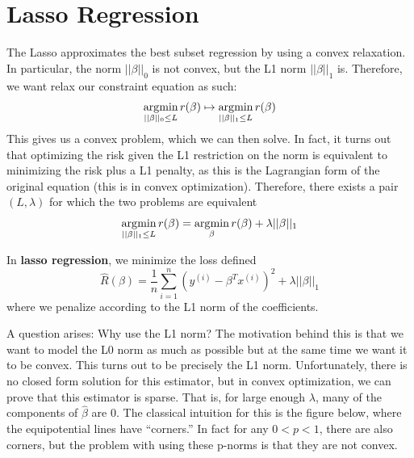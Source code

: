 \section{Lasso Regression} 

  The Lasso approximates the best subset regression by using a convex relaxation. In particular, the norm $||\beta||_0$ is not convex, but the L1 norm $||\beta||_1$ is. Therefore, we want relax our constraint equation as such: 
  \begin{equation}
    \operatorname*{\arg\!\min}_{||\beta||_0 \leq L} r(\beta) \mapsto \operatorname*{\arg\!\min}_{||\beta||_1 \leq L} r(\beta)
  \end{equation}
  This gives us a convex problem, which we can then solve. In fact, it turns out that optimizing the risk given the L1 restriction on the norm is equivalent to minimizing the risk plus a L1 penalty, as this is the Lagrangian form of the original equation (this is in convex optimization). Therefore, there exists a pair $(L, \lambda)$ for which the two problems are equivalent 
  \begin{equation}
    \operatorname*{\arg\!\min}_{||\beta||_1 \leq L} r(\beta) = \operatorname*{\arg\!\min}_{\beta} r(\beta) + \lambda ||\beta||_1
  \end{equation}

  \begin{definition}
    In \textbf{lasso regression}, we minimize the loss defined
    \begin{equation}
      \hat{R} (\beta) = \frac{1}{n} \sum_{i=1}^n (y^{(i)} - \beta^T x^{(i)})^2 + \lambda ||\beta||_1
    \end{equation}
    where we penalize according to the L1 norm of the coefficients. 
  \end{definition}

  A question arises: Why use the L1 norm? The motivation behind this is that we want to model the L0 norm as much as possible but at the same time we want it to be convex. This turns out to be precisely the L1 norm. Unfortunately, there is no closed form solution for this estimator, but in convex optimization, we can prove that this estimator is sparse. That is, for large enough $\lambda$, many of the components of $\hat{\beta}$ are $0$. The classical intuition for this is the figure below, where the equipotential lines have ``corners.'' In fact for any $0 < p < 1$, there are also corners, but the problem with using these p-norms is that they are not convex. 

